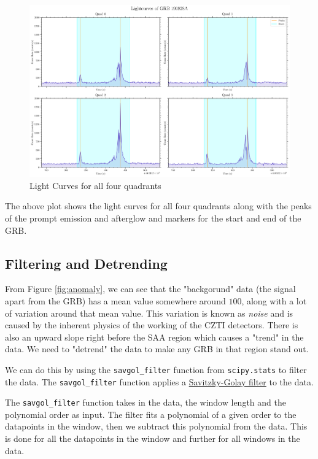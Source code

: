 \documentclass[11pt]{book} %
\begin{document}
\begin{figure}[H]
    \centering
    \includegraphics[scale=0.35]{Pictures/allquads.png}
    \caption{Light Curves for all four quadrants}
\end{figure}

The above plot shows the light curves for all four quadrants along with the peaks of the prompt emission and afterglow and markers for the start and end of the GRB.

\subsection{Filtering and Detrending}

From Figure \ref{fig:anomaly}, we can see that the "backgorund" data (the signal apart from the GRB) has a mean value somewhere around $100$, along with a lot of variation around that mean value. This variation is known as \textit{noise} and is caused by the inherent physics of the working of the CZTI detectors. There is also an upward slope right before the SAA region which causes a "trend" in the data. We need to "detrend" the data to make any GRB in that region stand out. 

We can do this by using the \lstinline[language=Python]{savgol_filter} function from \lstinline{scipy.stats} to filter the data. The \lstinline[language=Python]{savgol_filter} function applies a \href{https://en.wikipedia.org/wiki/Savitzky%E2%80%93Golay_filter}{Savitzky-Golay filter} to the data. 

The \lstinline[language=Python]{savgol_filter} function takes in the data, the window length and the polynomial order as input. The filter fits a polynomial of a given order to the datapoints in the window, then we subtract this polynomial from the data. This is done for all the datapoints in the window and further for all windows in the data.
\end{document}
